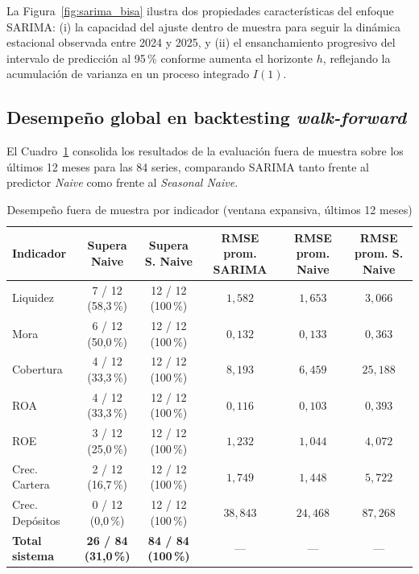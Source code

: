 \documentclass[11pt,letterpaper]{article}
\begin{document}
La Figura~\ref{fig:sarima_bisa} ilustra dos propiedades características del enfoque SARIMA: (i) la capacidad del ajuste dentro de muestra para seguir la dinámica estacional observada entre 2024 y 2025, y (ii) el ensanchamiento progresivo del intervalo de predicción al 95\,\% conforme aumenta el horizonte \(h\), reflejando la acumulación de varianza en un proceso integrado \(I(1)\).

\subsection{Desempeño global en backtesting \emph{walk-forward}}

El Cuadro~\ref{tab:backtest_global} consolida los resultados de la evaluación fuera de muestra sobre los últimos 12 meses para las 84 series, comparando SARIMA tanto frente al predictor \emph{Naive} como frente al \emph{Seasonal Naive}.

\begin{table}[H]
\centering
\caption{Desempeño fuera de muestra por indicador (ventana expansiva, últimos 12 meses)}
\label{tab:backtest_global}
\small
\begin{tabular}{lccccc}
\toprule
Indicador & Supera Naive & Supera S. Naive & RMSE prom. SARIMA & RMSE prom. Naive & RMSE prom. S. Naive \\
\midrule
Liquidez & 7 / 12 (58{,}3\,\%) & 12 / 12 (100\,\%) & \(1{,}582\) & \(1{,}653\) & \(3{,}066\) \\
Mora & 6 / 12 (50{,}0\,\%) & 12 / 12 (100\,\%) & \(0{,}132\) & \(0{,}133\) & \(0{,}363\) \\
Cobertura & 4 / 12 (33{,}3\,\%) & 12 / 12 (100\,\%) & \(8{,}193\) & \(6{,}459\) & \(25{,}188\) \\
ROA & 4 / 12 (33{,}3\,\%) & 12 / 12 (100\,\%) & \(0{,}116\) & \(0{,}103\) & \(0{,}393\) \\
ROE & 3 / 12 (25{,}0\,\%) & 12 / 12 (100\,\%) & \(1{,}232\) & \(1{,}044\) & \(4{,}072\) \\
Crec. Cartera & 2 / 12 (16{,}7\,\%) & 12 / 12 (100\,\%) & \(1{,}749\) & \(1{,}448\) & \(5{,}722\) \\
Crec. Depósitos & 0 / 12 (0{,}0\,\%) & 12 / 12 (100\,\%) & \(38{,}843\) & \(24{,}468\) & \(87{,}268\) \\
\midrule
\textbf{Total sistema} & \textbf{26 / 84 (31{,}0\,\%)} & \textbf{84 / 84 (100\,\%)} & --- & --- & --- \\
\bottomrule
\end{tabular}
\end{table}
\end{document}
